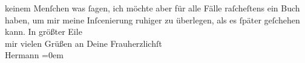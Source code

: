 \begin{ledgroupsized}[t]{13cm}
               keinem Menſchen was ſagen, ich möchte aber für alle Fälle raſcheſtens ein Buch haben,
               um mir meine Inſcenierung ruhiger zu überlegen, als es ſpäter geſchehen kann.\pend
           \pstart
           In größter Eile{\\[\baselineskip]}mir vielen Grüßen an Deine Frauherzlichſt{\\[\baselineskip]}\spacefill\mbox{Hermann}\pend
           \leftskip=0em{}\endnumbering{}\end{ledgroupsized}  \newcommand{\dateiname}{L01656}\newcommand{\titel}{Hermann Bahr an Arthur Schnitzler, 12. 2. 1907}\newcommand{\editorInnen}{ Kurt Ifkovits,  Martin Anton Müller}
      